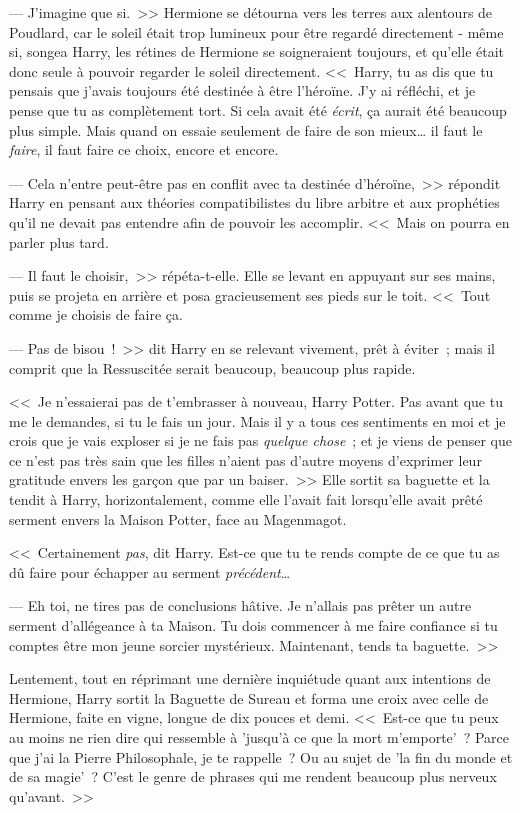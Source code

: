 --- J'imagine que si.~>> Hermione se détourna vers les terres aux alentours de Poudlard, car le soleil était trop lumineux pour être regardé directement - même si, songea Harry, les rétines de Hermione se soigneraient toujours, et qu'elle était donc seule à pouvoir regarder le soleil directement. <<~Harry, tu as dis que tu pensais que j'avais toujours été destinée à être l'héroïne. J'y ai réfléchi, et je pense que tu as complètement tort. Si cela avait été \emph{écrit}, ça aurait été beaucoup plus simple. Mais quand on essaie seulement de faire de son mieux… il faut le \emph{faire}, il faut faire ce choix, encore et encore.

--- Cela n'entre peut-être pas en conflit avec ta destinée d'héroïne,~>> répondit Harry en pensant aux théories compatibilistes du libre arbitre et aux prophéties qu'il ne devait pas entendre afin de pouvoir les accomplir. <<~Mais on pourra en parler plus tard.

--- Il faut le choisir,~>> répéta-t-elle. Elle se levant en appuyant sur ses mains, puis se projeta en arrière et posa gracieusement ses pieds sur le toit. <<~Tout comme je choisis de faire ça.

--- Pas de bisou~!~>> dit Harry en se relevant vivement, prêt à éviter~; mais il comprit que la Ressuscitée serait beaucoup, beaucoup plus rapide.

<<~Je n'essaierai pas de t'embrasser à nouveau, Harry Potter. Pas avant que tu me le demandes, si tu le fais un jour. Mais il y a tous ces sentiments en moi et je crois que je vais exploser si je ne fais pas \emph{quelque chose}~; et je viens de penser que ce n'est pas très sain que les filles n'aient pas d'autre moyens d'exprimer leur gratitude envers les garçon que par un baiser.~>> Elle sortit sa baguette et la tendit à Harry, horizontalement, comme elle l'avait fait lorsqu'elle avait prêté serment envers la Maison Potter, face au Magenmagot.

<<~Certainement \emph{pas}, dit Harry. Est-ce que tu te rends compte de ce que tu as dû faire pour échapper au serment \emph{précédent}…

--- Eh toi, ne tires pas de conclusions hâtive. Je n'allais pas prêter un autre serment d'allégeance à ta Maison. Tu dois commencer à me faire confiance si tu comptes être mon jeune sorcier mystérieux. Maintenant, tends ta baguette.~>>

Lentement, tout en réprimant une dernière inquiétude quant aux intentions de Hermione, Harry sortit la Baguette de Sureau et forma une croix avec celle de Hermione, faite en vigne, longue de dix pouces et demi. <<~Est-ce que tu peux au moins ne rien dire qui ressemble à 'jusqu'à ce que la mort m'emporte'~? Parce que j'ai la Pierre Philosophale, je te rappelle~? Ou au sujet de 'la fin du monde et de sa magie'~? C'est le genre de phrases qui me rendent beaucoup plus nerveux qu'avant.~>>

